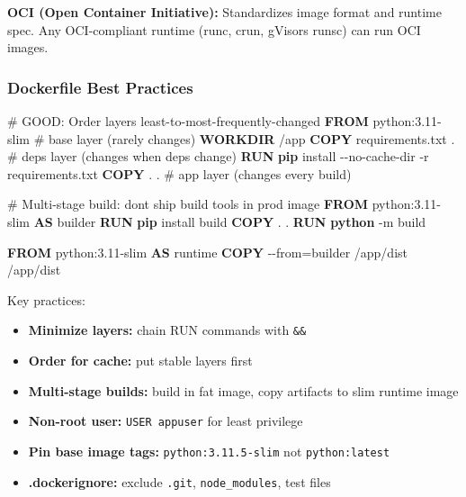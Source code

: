 \documentclass[11pt]{article}
\providecommand{\tightlist}{\setlength{\itemsep}{1pt}\setlength{\parskip}{0pt}}
\newenvironment{Shaded}{\begin{snugshade}}{\end{snugshade}}
\newcommand{\AttributeTok}[1]{\textcolor[rgb]{0.16,0.50,0.73}{#1}}
\newcommand{\CommentTok}[1]{\textcolor[rgb]{0.48,0.49,0.49}{#1}}
\newcommand{\ExtensionTok}[1]{\textcolor[rgb]{0.00,0.60,1.00}{\textbf{#1}}}
\newcommand{\KeywordTok}[1]{\textcolor[rgb]{0.81,0.81,0.76}{\textbf{#1}}}
\newcommand{\NormalTok}[1]{\textcolor[rgb]{0.81,0.81,0.76}{#1}}
\newcommand{\OperatorTok}[1]{\textcolor[rgb]{0.81,0.81,0.76}{#1}}
\begin{document}
\textbf{OCI (Open Container Initiative):} Standardizes image format and runtime spec. Any OCI-compliant runtime (runc, crun, gVisor\textquotesingle s runsc) can run OCI images.

\subsubsection{Dockerfile Best Practices}\label{dockerfile-best-practices}


\begin{Shaded}
\begin{Highlighting}[]
\CommentTok{\# GOOD: Order layers least{-}to{-}most{-}frequently{-}changed}
\KeywordTok{FROM}\NormalTok{ python:3.11{-}slim          }\CommentTok{\# base layer (rarely changes)}
\KeywordTok{WORKDIR}\NormalTok{ /app}
\KeywordTok{COPY}\NormalTok{ requirements.txt .        }\CommentTok{\# deps layer (changes when deps change)}
\KeywordTok{RUN} \ExtensionTok{pip}\NormalTok{ install }\AttributeTok{{-}{-}no{-}cache{-}dir} \AttributeTok{{-}r}\NormalTok{ requirements.txt}
\KeywordTok{COPY}\NormalTok{ . .                       }\CommentTok{\# app layer (changes every build)}

\CommentTok{\# Multi{-}stage build: don\textquotesingle{}t ship build tools in prod image}
\KeywordTok{FROM}\NormalTok{ python:3.11{-}slim }\KeywordTok{AS}\NormalTok{ builder}
\KeywordTok{RUN} \ExtensionTok{pip}\NormalTok{ install build}
\KeywordTok{COPY}\NormalTok{ . .}
\KeywordTok{RUN} \ExtensionTok{python} \AttributeTok{{-}m}\NormalTok{ build}

\KeywordTok{FROM}\NormalTok{ python:3.11{-}slim }\KeywordTok{AS}\NormalTok{ runtime}
\KeywordTok{COPY} \OperatorTok{{-}{-}from=builder}\NormalTok{ /app/dist /app/dist}
\end{Highlighting}
\end{Shaded}

Key practices:

\begin{itemize}
\tightlist
\item
  \textbf{Minimize layers:} chain RUN commands with \texttt{\&\&}
\item
  \textbf{Order for cache:} put stable layers first
\item
  \textbf{Multi-stage builds:} build in fat image, copy artifacts to slim runtime image
\item
  \textbf{Non-root user:} \texttt{USER\ appuser} for least privilege
\item
  \textbf{Pin base image tags:} \texttt{python:3.11.5-slim} not \texttt{python:latest}
\item
  \textbf{.dockerignore:} exclude \texttt{.git}, \texttt{node\_modules}, test files
\end{itemize}
\end{document}
